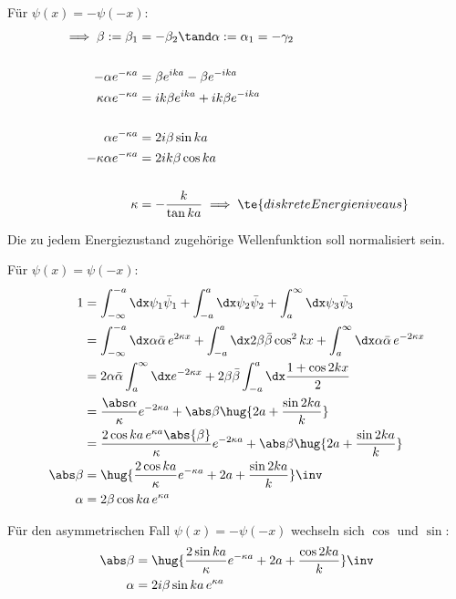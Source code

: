 \documentclass[ex]{exercise_3.0}
\begin{document}
Für \(\psi(x)=-\psi(-x)\):
\begin{align*}
    \implies \beta:=\beta_1&=-\beta_2\tand \alpha:=\alpha_1=-\gamma_2\\
    \\
    -\alpha e^{-\kappa a} &= \beta e^{i k a} - \beta e^{-i k a}\\
    \kappa \alpha e^{-\kappa a} &= ik \beta e^{i k a} + ik \beta e^{- i k a}\\
    \\
    \alpha e^{-\kappa a} &= 2i\beta \sin ka\\
    -\kappa \alpha e^{-\kappa a} &= 2ik\beta \cos ka\\
    \\
    \kappa &= -\frac k {\tan ka}\implies \te{diskrete Energieniveaus}\\
\end{align*}

Die zu jedem Energiezustand zugehörige Wellenfunktion soll normalisiert sein.

Für \(\psi(x)=\psi(-x)\):
\begin{align*}
    1 &= \int_{-\infty}^{-a}\dx\psi_1\bar\psi_1 + \int_{-a}^{a}\dx\psi_2\bar\psi_2 + \int_{a}^{\infty}\dx\psi_3\bar\psi_3\\
    &= \int_{-\infty}^{-a}\dx \alpha\bar\alpha \,e^{2\kappa x} + \int_{-a}^{a}\dx2\beta\bar\beta \cos^2 kx
    + \int_{a}^{\infty}\dx  \alpha\bar\alpha \,e^{-2\kappa x}\\
    &= 2 \alpha\bar\alpha \int_{a}^{\infty}\dx e^{-2\kappa x} + 2\beta\bar\beta\int_{-a}^{a}\dx\frac{1+ \cos 2kx}{2}\\
    &= \frac{\abs\alpha}{\kappa}e^{-2\kappa a} + \abs \beta\hug{2a +\frac{\sin 2ka}{k}}\\
    &= \frac{2\cos ka\,e^{\kappa a}\abs{\beta}}{\kappa}e^{-2\kappa a} + \abs \beta\hug{2a +\frac{\sin 2ka}{k}}\\
    \abs \beta &= \hug{\frac{2\cos ka}{\kappa}e^{-\kappa a} + 2a +\frac{\sin 2ka}{k}}\inv\\
    \alpha &= 2\beta \cos ka\, e^{\kappa a}\\
\end{align*}

Für den asymmetrischen Fall \(\psi(x)=-\psi(-x)\) wechseln sich \(\cos\) und \(\sin\):
\begin{align*}
    \abs \beta &= \hug{\frac{2\sin ka}{\kappa}e^{-\kappa a} + 2a +\frac{\cos 2ka}{k}}\inv\\
    \alpha &= 2i \beta \sin ka\, e^{\kappa a}\\
\end{align*}
\end{document}
